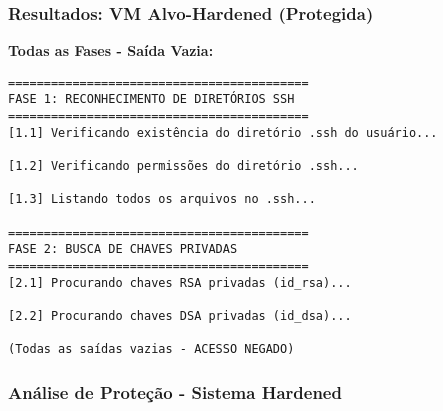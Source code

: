 \documentclass[12pt]{article}
\begin{document}
\subsubsection{Resultados: VM Alvo-Hardened (Protegida)}

\textbf{Todas as Fases - Saída Vazia:}
\begin{verbatim}
==========================================
FASE 1: RECONHECIMENTO DE DIRETÓRIOS SSH
==========================================
[1.1] Verificando existência do diretório .ssh do usuário...

[1.2] Verificando permissões do diretório .ssh...

[1.3] Listando todos os arquivos no .ssh...

==========================================
FASE 2: BUSCA DE CHAVES PRIVADAS
==========================================
[2.1] Procurando chaves RSA privadas (id_rsa)...

[2.2] Procurando chaves DSA privadas (id_dsa)...

(Todas as saídas vazias - ACESSO NEGADO)
\end{verbatim}

\subsubsection{Análise de Proteção - Sistema Hardened}
\end{document}
